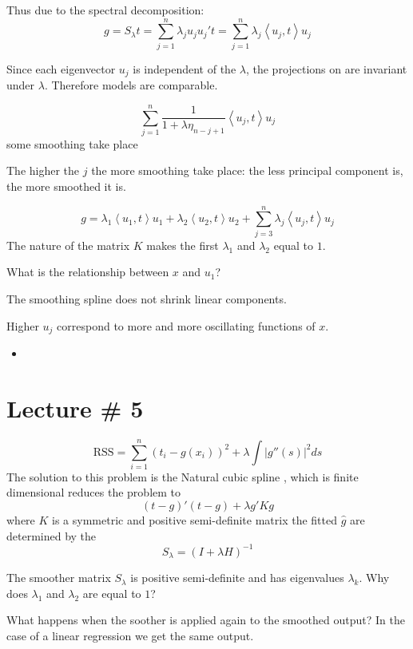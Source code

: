 \documentclass[a4paper]{article}
\newcommand{\brac}[1]{{\left ( #1 \right )}}
\newcommand{\abs}[1]{{\left | #1 \right |}}
\newcommand{\brkt}[1]{{\left\langle #1 \right\rangle}}
\newcommand{\RSS}{\text{RSS}}
\begin{document}
Thus due to the spectral decomposition:
\[g = S_\lambda t = \sum_{j=1}^n \lambda_j u_j u_j' t = \sum_{j=1}^n \lambda_j \brkt{u_j, t} u_j \]

Since each eigenvector $u_j$ is independent of the $\lambda$, the projections on are invariant under $\lambda$. Therefore models are comparable.

\[\sum_{j=1}^n \frac{1}{1+\lambda\eta_{n-j+1}} \brkt{u_j, t} u_j\]
some smoothing take place

The higher the $j$ the more smoothing take place:
	the less principal component is, the more smoothed it is.

\[g = \lambda_1\brkt{u_1, t} u_1 + \lambda_2\brkt{u_2, t} u_2 + \sum_{j=3}^n \lambda_j \brkt{u_j, t} u_j \]
The nature of the matrix $K$ makes the first $\lambda_1$ and $\lambda_2$ equal to $1$.

What is the relationship between $x$ and $u_1$?

The smoothing spline does not shrink linear components.

Higher $u_j$ correspond to more and more oscillating functions of $x$.




\begin{itemize}
	\item
\end{itemize}


\section{Lecture \# 5} %
\label{sec:lecture_5}

\[\RSS = \sum_{i=1}^n \brac{t_i - g(x_i)}^2 + \lambda \int \abs{g''(s)}^2ds\]
The solution to this problem is the Natural cubic spline , which is finite dimensional reduces the problem to
\[\brac{t-g}'\brac{t-g} + \lambda g'K g\]
where $K$ is a symmetric and positive  semi-definite matrix
the fitted $\hat{g}$ are determined by the 
\[S_\lambda = \brac{I+\lambda H}^{-1}\]

The smoother matrix $S_\lambda$ is positive semi-definite and has eigenvalues $\lambda_k$. Why does $\lambda_1$ and $\lambda_2$ are equal to $1$?


What happens when the soother is applied again to the smoothed output?
In the case of a linear regression we get the same output.
\end{document}
